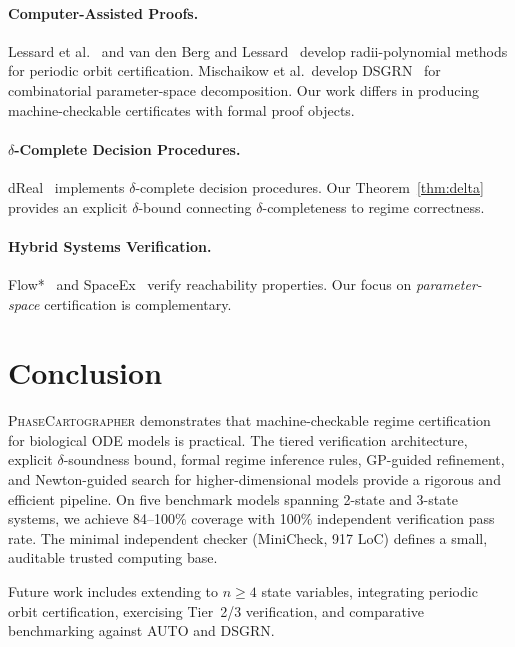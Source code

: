 \documentclass[11pt]{article}
\newcommand{\PC}{\textsc{PhaseCartographer}}
\begin{document}
\paragraph{Computer-Assisted Proofs.}
Lessard et al.~\cite{lessard2014computer} and van den Berg and Lessard~\cite{vandenberg2015rigorous} develop radii-polynomial methods for periodic orbit certification.
Mischaikow et al.\ develop DSGRN~\cite{cummins2016dsgrn} for combinatorial parameter-space decomposition.
Our work differs in producing machine-checkable certificates with formal proof objects.

\paragraph{$\delta$-Complete Decision Procedures.}
dReal~\cite{gao2013dreal} implements $\delta$-complete decision procedures.
Our Theorem~\ref{thm:delta} provides an explicit $\delta$-bound connecting $\delta$-completeness to regime correctness.

\paragraph{Hybrid Systems Verification.}
Flow*~\cite{chen2013flow} and SpaceEx~\cite{frehse2011spaceex} verify reachability properties.
Our focus on \emph{parameter-space} certification is complementary.

\section{Conclusion}
\label{sec:conclusion}

\PC{} demonstrates that machine-checkable regime certification for biological ODE models is practical.
The tiered verification architecture, explicit $\delta$-soundness bound, formal regime inference rules, GP-guided refinement, and Newton-guided search for higher-dimensional models provide a rigorous and efficient pipeline.
On five benchmark models spanning 2-state and 3-state systems, we achieve 84--100\% coverage with 100\% independent verification pass rate.
The minimal independent checker (MiniCheck, 917 LoC) defines a small, auditable trusted computing base.

Future work includes extending to $n \geq 4$ state variables, integrating periodic orbit certification, exercising Tier~2/3 verification, and comparative benchmarking against AUTO and DSGRN.
\end{document}
